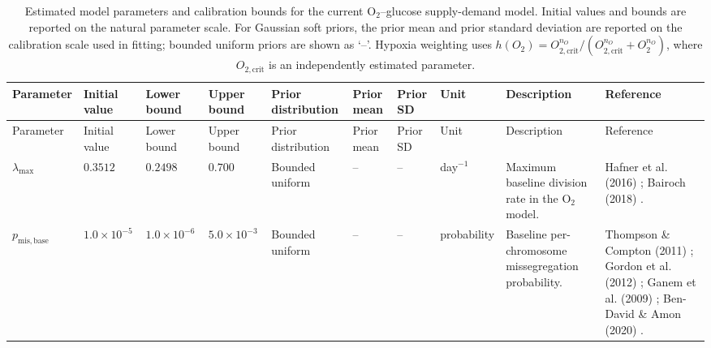 \begingroup
\scriptsize
\setlength{\tabcolsep}{1.8pt}
\setlength\LTleft{0pt}
\setlength\LTright{0pt}
\newlength{\ModelParamTableWidth}
\setlength{\ModelParamTableWidth}{\dimexpr\textwidth-18\tabcolsep\relax}
\begin{longtable}{@{}>{\raggedright\arraybackslash}p{0.08\ModelParamTableWidth}>{\raggedright\arraybackslash}p{0.06\ModelParamTableWidth}>{\raggedright\arraybackslash}p{0.06\ModelParamTableWidth}>{\raggedright\arraybackslash}p{0.06\ModelParamTableWidth}>{\raggedright\arraybackslash}p{0.11\ModelParamTableWidth}>{\raggedright\arraybackslash}p{0.06\ModelParamTableWidth}>{\raggedright\arraybackslash}p{0.06\ModelParamTableWidth}>{\raggedright\arraybackslash}p{0.065\ModelParamTableWidth}>{\raggedright\arraybackslash}p{0.20\ModelParamTableWidth}>{\raggedright\arraybackslash}p{0.245\ModelParamTableWidth}@{}}
\caption{Estimated model parameters and calibration bounds for the current O$_2$--glucose supply-demand model. Initial values and bounds are reported on the natural parameter scale. For Gaussian soft priors, the prior mean and prior standard deviation are reported on the calibration scale used in fitting; bounded uniform priors are shown as `--'. Hypoxia weighting uses $h(O_2)=O_{2,\mathrm{crit}}^{n_O}/(O_{2,\mathrm{crit}}^{n_O}+O_2^{n_O})$, where $O_{2,\mathrm{crit}}$ is an independently estimated parameter.}
\label{tab:tao_model_parameters}\\

\toprule
Parameter & Initial value & Lower bound & Upper bound & Prior distribution & Prior mean & Prior SD & Unit & Description & Reference \\
\midrule
\endfirsthead

\toprule
Parameter & Initial value & Lower bound & Upper bound & Prior distribution & Prior mean & Prior SD & Unit & Description & Reference \\
\midrule
\endhead

$\lambda_{\max}$ & $0.3512$ & $0.2498$ & $0.700$ & Bounded uniform & -- & -- & day$^{-1}$ & Maximum baseline division rate in the O$_2$ model. & Hafner et al. (2016) \cite{hafner_growth_2016}; Bairoch (2018) \cite{bairoch_a_cellosaurus_2018}. \\

$p_{\mathrm{mis,base}}$ & $1.0\times10^{-5}$ & $1.0\times10^{-6}$ & $5.0\times10^{-3}$ & Bounded uniform & -- & -- & probability & Baseline per-chromosome missegregation probability. & Thompson \& Compton (2011) \cite{thompson_chromosome_2011}; Gordon et al. (2012) \cite{gordon_causes_2012}; Ganem et al. (2009) \cite{ganem_mechanism_2009}; Ben-David \& Amon (2020) \cite{ben-david_context_2020}. \\


\end{longtable}
